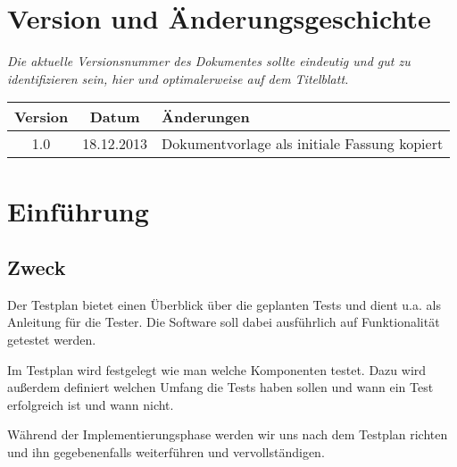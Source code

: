 \documentclass[fontsize=12pt,paper=a4,twoside]{scrartcl}
\begin{document}

\newpage

  \thispagestyle{fancy}
  \fancyhead{}
  \fancyfoot{}
  \renewcommand{\headrulewidth}{0.4pt}
  \tableofcontents

\newpage



\section*{Version und Änderungsgeschichte}

{\em Die aktuelle Versionsnummer des Dokumentes sollte eindeutig und gut zu
identifizieren sein, hier und optimalerweise auf dem Titelblatt.}

\begin{tabular}{ccl}
Version & Datum & Änderungen \\
\hline
1.0 & 18.12.2013 & Dokumentvorlage als initiale Fassung kopiert \\
\end{tabular}


\section{Einführung}\label{c01}

\subsection{Zweck}
Der Testplan bietet einen Überblick über die geplanten Tests und dient u.a. als Anleitung für die Tester. Die Software soll dabei ausführlich auf Funktionalität getestet werden. 

Im Testplan wird festgelegt wie man welche Komponenten testet. Dazu wird außerdem definiert welchen Umfang die Tests haben sollen und wann ein Test erfolgreich ist und wann nicht.

Während der Implementierungsphase werden wir uns nach dem Testplan richten und ihn gegebenenfalls weiterführen und vervollständigen.
\end{document}
